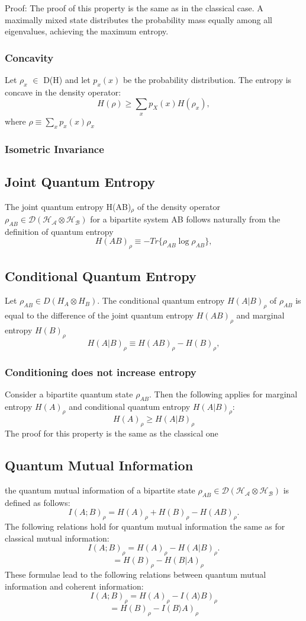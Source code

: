 Proof: The proof of this property is the same as in the classical case. A maximally mixed state distributes the probability mass equally among all eigenvalues, achieving the maximum entropy.

\subsubsection{Concavity}
Let $\rho_x$ $\in$ D(H) and let $p_x(x)$ be the probability distribution. The entropy is concave in the density operator:
\[
H(\rho) \geq \sum_x p_X(x) H(\rho_x),
\]
where $\rho \equiv \sum_xp_x(x)\rho_x$

\subsubsection{Isometric Invariance}

\subsection{Joint Quantum Entropy}
The joint quantum entropy H(AB)$_\rho$ of the density operator $\rho_{AB} \in \mathcal{D}(\mathcal{H_A} \otimes \mathcal{H_B}) $ for a bipartite system AB follows naturally from the definition of quantum entropy
\[
H(AB)_\rho \equiv -Tr\{\rho_{AB} \log \rho_{AB}\},
\]


\subsection{Conditional Quantum Entropy}
Let $\rho_{AB} \in D(H_A \otimes H_B)$. The conditional quantum entropy $H(A|B)_\rho$ of $\rho_{AB}$ is equal to the difference of the joint quantum entropy $H(AB)_\rho$ and marginal entropy $H(B)_\rho$
\[
H(A|B)_\rho \equiv H(AB)_\rho - H(B)_\rho,
\]

\subsubsection{Conditioning does not increase entropy}
Consider a bipartite quantum state $\rho_{AB}$. Then the following applies for marginal entropy $H(A)_\rho$ and conditional quantum entropy $H(A|B)_\rho$:
\[
H(A)_\rho \geq H(A|B)_\rho
\]
The proof for this property is the same as the classical one


\subsection{Quantum Mutual Information}
the quantum mutual information of a bipartite state $\rho_{AB} \in \mathcal{D}(\mathcal{H_A} \otimes \mathcal{H_B})$ is defined as follows:
\[
I(A;B)_\rho = H(A)_\rho + H(B)_\rho - H(AB)_\rho.
\]
The following relations hold for quantum mutual information the same as for classical mutual information:
\[
I(A;B)_\rho = H(A)_\rho - H(A|B)_\rho.
\]
\[
            \quad = H(B)_\rho - H(B|A)_\rho
\]
These formulae lead to the following relations between quantum mutual information and coherent information:
\[
I(A;B)_\rho = H(A)_\rho - I(A\rangle{}B)_\rho
\]
\[
 = H(B)_\rho - I(B\rangle{}A)_\rho
\]

